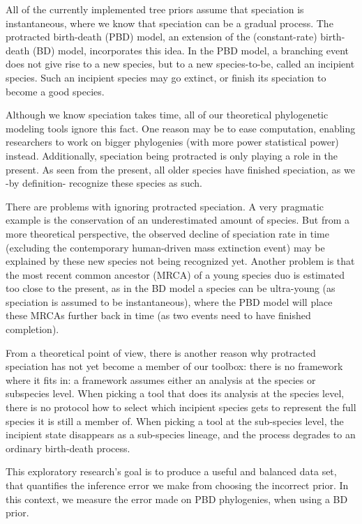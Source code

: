 \documentclass{article}
\begin{document}
All of the currently implemented tree priors assume that speciation is 
instantaneous, where we know that speciation can be a gradual process.
The protracted birth-death (PBD) model, an extension of 
the (constant-rate) birth-death (BD) model, incorporates this idea.
In the PBD model, a branching event does not give rise to a new species, but to
a new species-to-be, called an incipient species. Such an incipient
species may go extinct, or finish its speciation to become a good species.

Although we know speciation takes time, all of our theoretical 
phylogenetic modeling tools ignore this fact. One reason may be to ease
computation, enabling researchers to work on bigger phylogenies (with
more power statistical power) instead. Additionally, speciation being
protracted is only playing a role in the present. As seen from the present,
all older species have finished speciation, as we -by definition- recognize
these species as such. 

There are problems with ignoring protracted speciation. A very pragmatic
example is the conservation of an underestimated amount of species. 
But from a more theoretical perspective, the
observed decline of speciation rate in time (excluding the contemporary human-driven
mass extinction event) may be explained by these new species not being 
recognized yet. Another problem is that the most recent common 
ancestor (MRCA) of a young species duo is estimated 
too close to the present, as in the BD model a species can be 
ultra-young (as speciation is assumed to be instantaneous), 
where the PBD model will place these MRCAs
further back in time (as two events need to have finished completion).

From a theoretical point of view, there is another reason why protracted
speciation has not yet become a member of our toolbox: there is no framework
where it fits in: a framework assumes either an analysis at the species or
subspecies level. When picking a tool that does its analysis at the
species level, there is no protocol how to select which incipient species
gets to represent the full species it is still a member of. When picking
a tool at the sub-species level, the incipient state disappears as a
sub-species lineage, and the process degrades to an ordinary birth-death 
process.

This exploratory research's goal is to produce a 
useful and balanced data set, that quantifies the inference error 
we make from choosing the incorrect prior. In this context, 
we measure the error made on PBD phylogenies, when using a BD prior.
\end{document}
